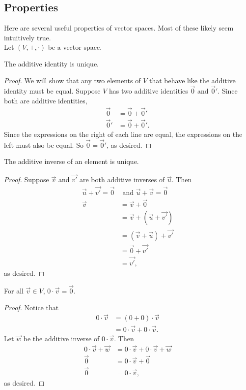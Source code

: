 \subsection{Properties}
Here are several useful properties of vector spaces.
Most of these likely seem intuitively true.\\

Let $(V,+,\cdot)$ be a vector space.

\begin{theorem}
	The additive identity is unique.
\end{theorem}
\begin{proof}
	We will show that any two elements of $V$ that behave like the additive identity must be equal.
	Suppose $V$ has two additive identities $\vec{0}$ and $\vec{0}'$.
	Since both are additive identities,
	\begin{align*}
		\vec{0} &= \vec{0} + \vec{0}' \\
		\vec{0}' &= \vec{0} + \vec{0}'.
	\end{align*}
	Since the expressions on the right of each line are equal, the expressions on the left must also be equal.
	So $\vec{0} = \vec{0}'$, as desired.
\end{proof}

\begin{theorem}
	The additive inverse of an element is unique.
\end{theorem}
\begin{proof}
	Suppose $\vec{v}$ and $\vec{v'}$ are both additive inverses of $\vec{u}$.
	Then
	\begin{align*}
		\vec{u} + \vec{v'} = \vec{0} &\text{ and }\vec{u} + \vec{v} = \vec{0} \\
		\vec{v} &= \vec{v} + \vec{0} \\
		&= \vec{v} + \left(\vec{u} + \vec{v'}\right) \\
		&= (\vec{v} + \vec{u}) + \vec{v'} \\
		&= \vec{0} + \vec{v'} \\
		&= \vec{v'},
	\end{align*}
	as desired.
\end{proof}

\begin{theorem}
	For all $\vec{v} \in V$, $0 \cdot \vec{v} = \vec{0}$.
\end{theorem}
\begin{proof}
	Notice that
	\begin{align*}
		0 \cdot \vec{v} &= (0 + 0) \cdot \vec{v} \\
		&= 0\cdot\vec{v} + 0\cdot\vec{v}.
	\end{align*}
	Let $\vec{w}$ be the additive inverse of $0\cdot\vec{v}$.
	Then
	\begin{align*}
		0\cdot\vec{v} + \vec{w} &= 0\cdot\vec{v} + 0\cdot\vec{v} + \vec{w} \\
		\vec{0} &= 0\cdot\vec{v} + \vec{0} \\
		\vec{0} &= 0\cdot\vec{v},
	\end{align*}
	as desired.
\end{proof}

